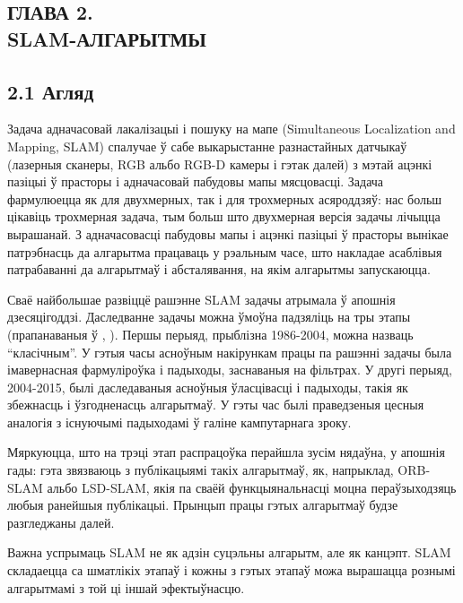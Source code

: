 \begin{center}
    \section*{ГЛАВА 2. \\ SLAM-АЛГАРЫТМЫ}
\end{center}

\subsection*{2.1 Агляд}

Задача адначасовай лакалізацыі і пошуку на мапе (Simultaneous Localization and Mapping, SLAM)
спалучае ў сабе выкарыстанне разнастайных датчыкаў (лазерныя сканеры, RGB альбо RGB-D
камеры і гэтак далей) з мэтай ацэнкі пазіцыі ў прасторы і адначасовай пабудовы мапы мясцовасці.
Задача фармулюецца як для двухмерных, так і для трохмерных асяроддзяў: нас больш цікавіць
трохмерная задача, тым больш што двухмерная версія задачы лічыцца вырашанай. З адначасовасці
пабудовы мапы і ацэнкі пазіцыі ў прасторы вынікае патрэбнасць да алгарытма працаваць у рэальным часе,
што накладае асаблівыя патрабаванні да алгарытмаў і абсталявання, на якім алгарытмы запускаюцца.

Сваё найбольшае развіццё рашэнне SLAM задачы атрымала ў апошнія дзесяцігоддзі. Даследванне
задачы можна ўмоўна падзяліць на тры этапы (прапанаваныя ў \cite{DBLP:journals/corr/CadenaCCLSN0L16},
\cite{Li2016RealtimeSL}). Першы перыяд, прыблізна 1986-2004, можна назваць ``класічным''.
У гэтыя часы асноўным накірункам працы па рашэнні задачы была імавернасная фармуліроўка
і падыходы, заснаваныя на фільтрах. У другі перыяд, 2004-2015, былі даследаваныя асноўныя
ўласцівасці і падыходы, такія як збежнасць і ўзгодненасць алгарытмаў. У гэты час былі
праведзеныя цесныя аналогія з існуючымі падыходамі ў галіне кампутарнага зроку.

Мяркуюцца, што на трэці этап распрацоўка перайшла зусім нядаўна, у апошнія гады: гэта звязваюць
з публікацыямі такіх алгарытмаў, як, напрыклад, ORB-SLAM альбо LSD-SLAM, якія па сваёй
функцыянальнасці моцна пераўзыходзяць любыя ранейшыя публікацыі. Прынцып працы гэтых алгарытмаў
будзе разгледжаны далей.

Важна успрымаць SLAM не як адзін суцэльны алгарытм, але як канцэпт. SLAM складаецца са
шматлікіх этапаў і кожны з гэтых этапаў можа вырашацца рознымі алгарытмамі з той ці іншай эфектыўнасцю.

